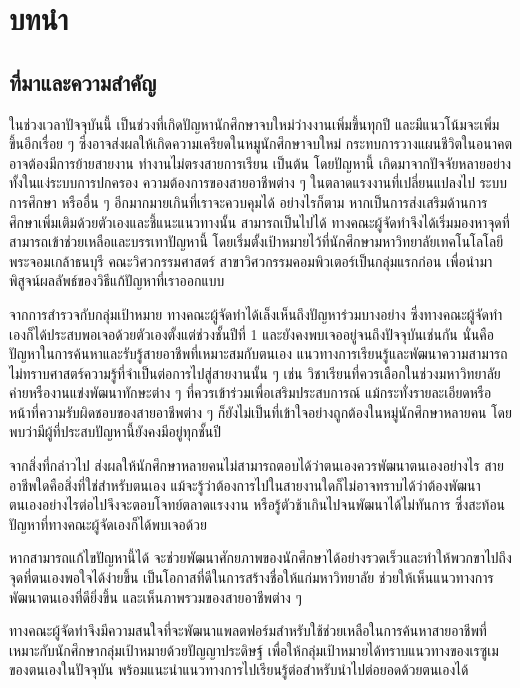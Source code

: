 \chapter{บทนำ}

\section{ที่มาและความสำคัญ}


ในช่วงเวลาปัจจุบันนี้ เป็นช่วงที่เกิดปัญหานักศึกษาจบใหม่ว่างงานเพิ่มขึ้นทุกปี \cite{mrgonline} และมีแนวโน้มจะเพิ่มขึ้นอีกเรื่อย ๆ ซึ่งอาจส่งผลให้เกิดความเครียดในหมูนักศึกษาจบใหม่ กระทบการวางแผนชีวิตในอนาคต อาจต้องมีการย้ายสายงาน ทำงานไม่ตรงสายการเรียน เป็นต้น โดยปัญหานี้ เกิดมาจากปัจจัยหลายอย่างทั้งในแง่ระบบการปกครอง ความต้องการของสายอาชีพต่าง ๆ ในตลาดแรงงานที่เปลี่ยนแปลงไป ระบบการศึกษา หรืออื่น ๆ อีกมากมายเกินที่เราจะควบคุมได้ อย่างไรก็ตาม หากเป็นการส่งเสริมด้านการศึกษาเพิ่มเติมด้วยตัวเองและชี้แนะแนวทางนั้น สามารถเป็นไปได้ ทางคณะผู้จัดทำจึงได้เริ่มมองหาจุดที่สามารถเข้าช่วยเหลือและบรรเทาปัญหานี้ โดยเริ่มตั้งเป้าหมายไว้ที่นักศึกษามหาวิทยาลัยเทคโนโลโลยีพระจอมเกล้าธนบุรี คณะวิศวกรรมศาสตร์ สาขาวิศวกรรมคอมพิวเตอร์เป็นกลุ่มแรกก่อน เพื่อนำมาพิสูจน์ผลลัพธ์ของวิธีแก้ปัญหาที่เราออกแบบ

จากการสำรวจกับกลุ่มเป้าหมาย ทางคณะผู้จัดทำได้เล็งเห็นถึงปัญหาร่วมบางอย่าง ซึ่งทางคณะผู้จัดทำเองก็ได้ประสบพอเจอด้วยตัวเองตั้งแต่ช่วงชั้นปีที่ 1 และยังคงพบเจออยู่จนถึงปัจจุบันเช่นกัน นั่นคือปัญหาในการค้นหาและรับรู้สายอาชีพที่เหมาะสมกับตนเอง แนวทางการเรียนรู้และพัฒนาความสามารถ ไม่ทราบศาสตร์ความรู้ที่จำเป็นต่อการไปสู่สายงานนั้น ๆ เช่น วิชาเรียนที่ควรเลือกในช่วงมหาวิทยาลัย ค่ายหรืองานแข่งพัฒนาทักษะต่าง ๆ ที่ควรเข้าร่วมเพื่อเสริมประสบการณ์ แม้กระทั่งรายละเอียดหรือหน้าที่ความรับผิดชอบของสายอาชีพต่าง ๆ ก็ยังไม่เป็นที่เข้าใจอย่างถูกต้องในหมู่นักศึกษาหลายคน โดยพบว่ามีผู้ที่ประสบปัญหานี้ยังคงมีอยู่ทุกชั้นปี

จากสิ่งที่กล่าวไป ส่งผลให้นักศึกษาหลายคนไม่สามารถตอบได้ว่าตนเองควรพัฒนาตนเองอย่างไร สายอาชีพใดคือสิ่งที่ใช่สำหรับตนเอง แม้จะรู้ว่าต้องการไปในสายงานใดก็ไม่อาจทราบได้ว่าต้องพัฒนาตนเองอย่างไรต่อไปจึงจะตอบโจทย์ตลาดแรงงาน หรือรู้ตัวช้าเกินไปจนพัฒนาได้ไม่ทันการ ซึ่งสะท้อนปัญหาที่ทางคณะผู้จัดเองก็ได้พบเจอด้วย

หากสามารถแก้ไขปัญหานี้ได้ จะช่วยพัฒนาศักยภาพของนักศึกษาได้อย่างรวดเร็วและทำให้พวกขาไปถึงจุดที่ตนเองพอใจได้ง่ายขึ้น เป็นโอกาสที่ดีในการสร้างชื่อให้แก่มหาวิทยาลัย ช่วยให้เห็นแนวทางการพัฒนาตนเองที่ดียิ่งขึ้น และเห็นภาพรวมของสายอาชีพต่าง ๆ

ทางคณะผู้จัดทำจึงมีความสนใจที่จะพัฒนาแพลตฟอร์มสำหรับใช้ช่วยเหลือในการค้นหาสายอาชีพที่เหมาะกับนักศึกษากลุ่มเป้าหมายด้วยปัญญาประดิษฐ์ เพื่อให้กลุ่มเป้าหมายได้ทราบแนวทางของเรซูเมของตนเองในปัจจุบัน พร้อมแนะนำแนวทางการไปเรียนรู้ต่อสำหรับนำไปต่อยอดด้วยตนเองได้

